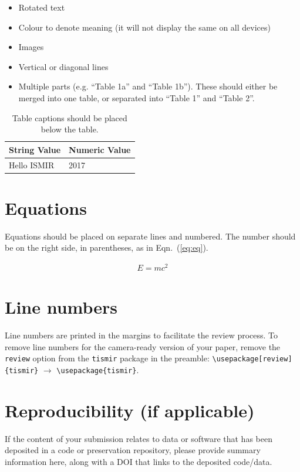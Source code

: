 \documentclass{article}
\begin{document}
\begin{itemize}
  \item Rotated text
  \item Colour to denote meaning (it will not display the same on all devices)
  \item Images
  \item Vertical or diagonal lines
  \item Multiple parts (e.g. ``Table 1a'' and ``Table 1b'').
  These should either be merged into one table,
  or separated into ``Table 1'' and ``Table 2''.
\end{itemize}

\begin{table}[htpb]
\centering
  \begin{tabular}{ll}
  \toprule
  \bfseries String Value & \bfseries Numeric Value \\ \midrule
  Hello ISMIR  & 2017          \\
  \bottomrule
  \end{tabular}
  \caption{Table captions should be placed below the table.}
\label{tab:table}
\end{table}

\section{Equations}\label{sec:equations}

Equations should be placed on separate lines and numbered.
The number should be on the right side, in parentheses,
as in Eqn.~(\ref{eq:eq}).

\begin{align}\label{eq:eq}
E = mc^2
\end{align}

\section{Line numbers}
Line numbers are printed in the margins to facilitate the
review process. To remove line numbers for the camera-ready
version of your paper, remove the \verb=review= option from the
\verb=tismir= package in the preamble:
\verb=\usepackage[review]{tismir}= $\rightarrow$
\verb=\usepackage{tismir}=.

\section{Reproducibility (if applicable)}

If the content of your submission relates to data or software
that has been deposited in a code or preservation repository,
please provide summary information here, along with a DOI that
links to the deposited code/data.
\end{document}
